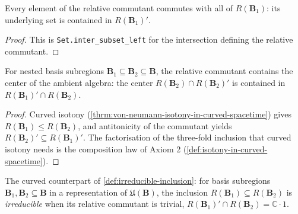 \begin{theorem}
    \label{thrm:relative-commutant-coe-commutant-in-curved-spacetime}
    \leanok
    Every element of the relative commutant commutes with all of $R(\mathbf{B}_1)$: its underlying set is contained in $R(\mathbf{B}_1)'$.
\end{theorem}
\begin{proof}
    \leanok
    This is \texttt{Set.inter\_subset\_left} for the intersection defining the relative commutant.
\end{proof}

\begin{theorem}
    \label{thrm:relative-commutant-center-in-curved-spacetime}
    \leanok
    For nested basis subregions $\mathbf{B}_1 \subseteq \mathbf{B}_2 \subseteq \mathbf{B}$, the relative commutant contains the center of the ambient algebra: the center $R(\mathbf{B}_2) \cap R(\mathbf{B}_2)'$ is contained in $R(\mathbf{B}_1)' \cap R(\mathbf{B}_2)$.
\end{theorem}
\begin{proof}
    \leanok
    Curved isotony (\ref{thrm:von-neumann-isotony-in-curved-spacetime}) gives $R(\mathbf{B}_1) \le R(\mathbf{B}_2)$, and antitonicity of the commutant yields $R(\mathbf{B}_2)' \subseteq R(\mathbf{B}_1)'$. The factorisation of the three-fold inclusion that curved isotony needs is the composition law of Axiom 2 (\ref{def:isotony-in-curved-spacetime}).
\end{proof}

\begin{definition}
    \label{def:irreducible-inclusion-in-curved-spacetime}
    \leanok
    The curved counterpart of \ref{def:irreducible-inclusion}: for basis subregions $\mathbf{B}_1, \mathbf{B}_2 \subseteq \mathbf{B}$ in a representation of $\mathfrak{U}(\mathbf{B})$, the inclusion $R(\mathbf{B}_1) \subseteq R(\mathbf{B}_2)$ is \emph{irreducible} when its relative commutant is trivial, $R(\mathbf{B}_1)' \cap R(\mathbf{B}_2) = \mathbb{C}\cdot 1$.
\end{definition}

